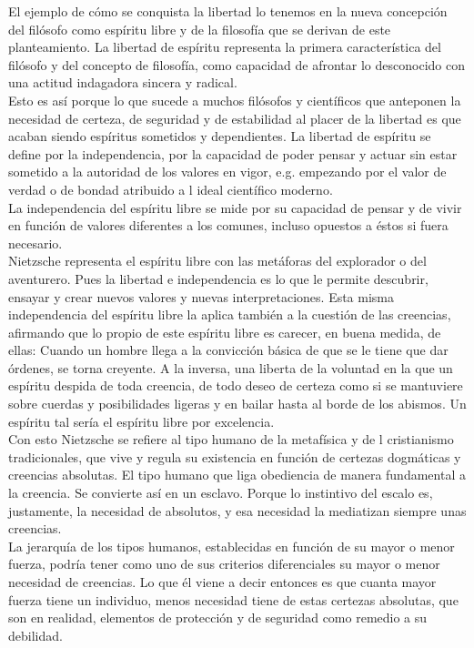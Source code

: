 \documentclass[a4paper, 10pt, twocolumn, spanish]{article}
\begin{document}
El ejemplo de cómo se conquista la libertad lo tenemos en la nueva
concepción del filósofo como espíritu libre y de la filosofía que se
derivan de este planteamiento. La libertad de espíritu representa la
primera característica del filósofo y del concepto de filosofía, como
capacidad de afrontar lo desconocido con una actitud indagadora
sincera y radical.\\[0pt]
Esto es así porque lo que sucede a muchos filósofos y científicos que
anteponen la necesidad de certeza, de seguridad y de estabilidad al
placer de la libertad es que acaban siendo espíritus sometidos y
dependientes. La libertad de espíritu se define por la independencia,
por la capacidad de poder pensar y actuar sin estar sometido a la
autoridad de los valores en vigor, e.g. empezando por el valor de
verdad o de bondad atribuido a l ideal científico moderno.\\[0pt]

La independencia del espíritu libre se mide por su capacidad de pensar
y de vivir en función de valores diferentes a los comunes, incluso
opuestos a éstos si fuera necesario.\\[0pt]
Nietzsche representa el espíritu libre con las metáforas del
explorador o del aventurero. Pues la libertad e independencia es lo
que le permite descubrir, ensayar y crear nuevos valores y nuevas
interpretaciones. Esta misma independencia del espíritu libre la
aplica también a la cuestión de las creencias, afirmando que lo propio
de este espíritu libre es carecer, en buena medida, de ellas: Cuando
un hombre llega a la convicción básica de que se le tiene que dar
órdenes, se torna creyente. A la inversa, una liberta de la voluntad
en la que un espíritu despida de toda creencia, de todo deseo de
certeza como si se mantuviere sobre cuerdas y posibilidades ligeras y
en bailar hasta al borde de los abismos. Un espíritu tal sería el
espíritu libre por excelencia.\\[0pt]

Con esto Nietzsche se refiere al tipo humano de la metafísica y de l
cristianismo tradicionales, que vive y regula su existencia en función
de certezas dogmáticas y creencias absolutas. El tipo humano que liga
obediencia de manera fundamental a la creencia. Se convierte así en un
esclavo. Porque lo instintivo del escalo es, justamente, la necesidad
de absolutos, y esa necesidad la mediatizan siempre unas creencias.\\[0pt]
La jerarquía de los tipos humanos, establecidas en función de su mayor
o menor fuerza, podría tener como uno de sus criterios diferenciales
su mayor o menor necesidad de creencias. Lo que él viene a decir
entonces es que cuanta mayor fuerza tiene un individuo, menos
necesidad tiene de estas certezas absolutas, que son en realidad,
elementos de protección y de seguridad como remedio a su debilidad.
\end{document}
